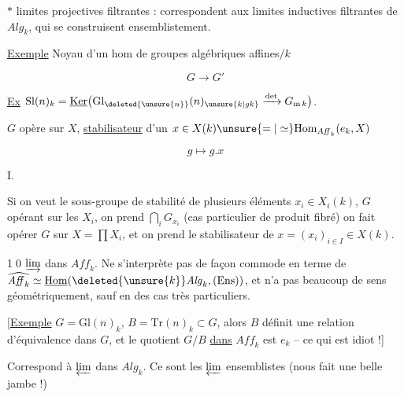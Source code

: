 
$*$ limites projectives filtrantes : correspondent aux limites inductives filtrantes de $\mathit{Alg}_k$, qui se construisent ensemblistement.

\uline{Exemple} Noyau d'un hom de groupes algébriques affines$/k$

\[
G\longrightarrow G'
\]

\uline{Ex} $\mathrm{Sl}(n)_k=\underline{\mathrm{Ker}}\bigl(\mathrm{Gl}_{\deleted{\unsure{n}}}(n)_{\unsure{k|gk}}\xrightarrow{\det}G_{\mathrm m\,k}\bigr)$. 


$G$ opère sur $X$, \uline{stabilisateur} d'un $x\in X(k)\unsure{=|\simeq}\mathrm{Hom}_{\mathit{Aff}_k}(e_k,X)$

\[
g\longmapsto g.x
\]


$\mathrm I$.

Si on veut le sous-groupe de stabilité de plusieurs éléments $x_i\in X_i(k)$, $G$ opérant sur les $X_i$, on prend $\bigcap_i G_{x_i}$ (cas particulier de produit fibré)  on fait opérer $G$ sur $X=\prod X_i$, et on prend le stabilisateur de $x=(x_i)_{i\in I}\in X(k)$.

\textcircled{10} $\varinjlim$ dans $\mathit{Aff}_k$. Ne s'interprète pas de façon commode en terme de $\widehat{\mathit{Aff}_k}\simeq\underline{\mathrm{Hom}}(\deleted{\unsure{k}}\mathit{Alg}_k,(\mathrm{Ens}))$, et n'a pas beaucoup de sens géométriquement, sauf en des cas très particuliers.

[\uline{Exemple} $G=\mathrm{Gl}(n)_k$, $B=\mathrm{Tr}(n)_k\subset G$, alors  $B$ définit une relation d'équivalence dans $G$, et le quotient $G/B$ \uline{dans} $\mathit{Aff}_k$ est $e_k$ -- ce qui est idiot !]


Correspond à $\varprojlim$ dans $\mathit{Alg}_k$. Ce sont les $\varprojlim$ ensemblistes (nous fait une belle jambe !)

